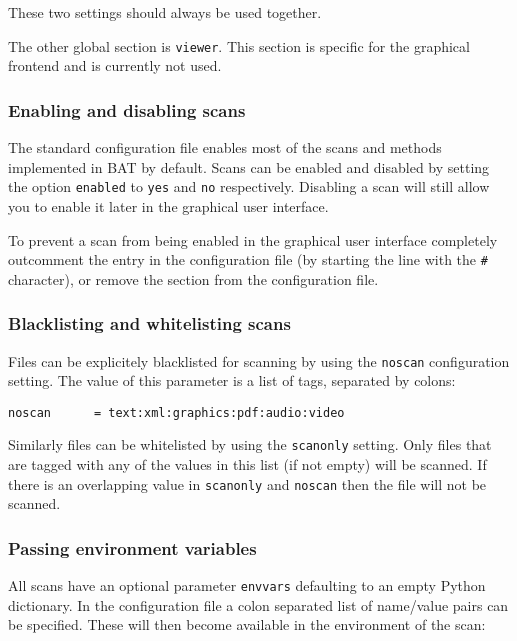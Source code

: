 \documentclass[10pt]{article}
\begin{document}
These two settings should always be used together.

The other global section is \texttt{viewer}. This section is specific for the
graphical frontend and is currently not used.

\subsubsection{Enabling and disabling scans}

The standard configuration file enables most of the scans and methods
implemented in BAT by default. Scans can be enabled and disabled by setting the
option \texttt{enabled} to \texttt{yes} and \texttt{no} respectively. Disabling
a scan will still allow you to enable it later in the graphical user interface.

To prevent a scan from being enabled in the graphical user interface completely
outcomment the entry in the configuration file (by starting the line with the
\texttt{\#} character), or remove the section from the configuration file.

\subsubsection{Blacklisting and whitelisting scans}

Files can be explicitely blacklisted for scanning by using the \texttt{noscan}
configuration setting. The value of this parameter is a list of tags, separated
by colons:

\begin{verbatim}
noscan      = text:xml:graphics:pdf:audio:video
\end{verbatim}

Similarly files can be whitelisted by using the \texttt{scanonly} setting. Only
files that are tagged with any of the values in this list (if not empty) will
be scanned. If there is an overlapping value in \texttt{scanonly} and
\texttt{noscan} then the file will not be scanned.

\subsubsection{Passing environment variables}

All scans have an optional parameter \texttt{envvars} defaulting to an empty
Python dictionary. In the configuration file a colon separated list of
name/value pairs can be specified. These will then become available in the
environment of the scan:
\end{document}
